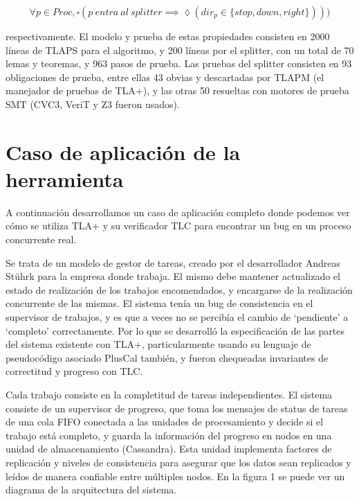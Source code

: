 \documentclass[runningheads]{llncs}
\begin{document}
\[
    \forall p \in Proc, \square(p\ entra\ al\ splitter \implies \lozenge(dir_p \in \{stop, down, right\})))    
\]

respectivamente.
El modelo y prueba de estas propiedades consisten en 2000 líneas de TLAPS para el algoritmo, y 200 líneas por el splitter, con un total de 70 lemas y teoremas, y 963 pasos de prueba. Las pruebas del splitter consisten en 93 obligaciones de prueba, entre ellas 43 obvias y descartadas por TLAPM (el manejador de pruebas de TLA+), y las otras 50 resueltas con motores de prueba SMT (CVC3, VeriT y Z3 fueron usados).

\section{Caso de aplicación de la herramienta}
A continuación desarrollamos un caso de aplicación completo donde podemos ver cómo se utiliza TLA+ y su verificador TLC para encontrar un bug en un proceso concurrente real.

Se trata de un modelo de gestor de tareas, creado por el desarrollador Andreas Stührk para la empresa donde trabaja. El mismo debe mantener actualizado el estado de realización de los trabajos encomendados, y encargarse de la realización concurrente de las mismas. El sistema tenía un bug de consistencia en el supervisor de trabajos, y es que a veces no se percibía el cambio de ‘pendiente’ a ‘completo’ correctamente. Por lo que se desarrolló la especificación de las partes del sistema existente con TLA+, particularmente usando su lenguaje de pseudocódigo asociado PlusCal también, y fueron chequeadas invariantes de correctitud y progreso con TLC.

Cada trabajo consiste en la completitud de tareas independientes. El sistema consiste de un supervisor de progreso, que toma los mensajes de status de tareas de una cola FIFO conectada a las unidades de procesamiento y decide si el trabajo está completo, y guarda la información del progreso en nodos en una unidad de almacenamiento (Cassandra). Esta unidad implementa factores de replicación y niveles de consistencia para asegurar que los datos sean replicados y leídos de manera confiable entre múltiples nodos. En la figura 1 se puede ver un diagrama de la arquitectura del sistema. 
\end{document}
